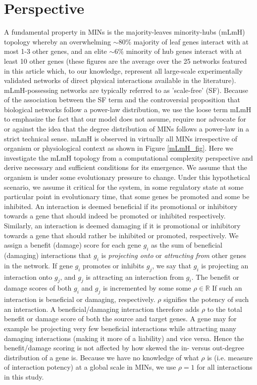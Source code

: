 \section{Perspective}
        A fundamental property in MINs is the majority-leaves minority-hubs  (mLmH) topology whereby an overwhelming ${\sim}$80\% majority of leaf genes interact with at most 1-3 other genes, and an elite ${\sim}$6\% minority of hub genes interact with at least 10 other genes (these figures are the average over the 25 networks featured in this article which, to our knowledge, represent all large-scale experimentally validated networks of direct physical interactions available in the literature). mLmH-possessing networks are typically referred to as 'scale-free' (SF). Because of the association between the SF term and the controversial proposition \cite{arita_metabolic_2004, tanaka_protein_2005, fox_keller_revisiting_2005, khanin_how_2006} that biological networks follow a power-law distribution, we use the loose term mLmH to emphasize the fact that our model does not assume, require nor advocate for or against the idea that the degree distribution of MINs follows a power-law in a strict technical sense.
        mLmH is observed in virtually all MINs irrespective of organism or physiological context as shown in Figure \ref{mLmH_fig}. Here we investigate the mLmH topology from a computational complexity perspective and derive necessary and sufficient conditions for its emergence. We assume that the organism is under some evolutionary pressure to change. Under this hypothetical scenario, we assume it critical for the system, in some regulatory state at some particular point in evolutionary time,  that some genes be promoted and some be inhibited. An interaction is deemed beneficial if its promotional or inhibitory towards a gene that should indeed be promoted or inhibited respectively. Similarly, an interaction is deemed  damaging if it is promotional or inhibitory towards a gene that should rather be inhibited or promoted, respectively. We assign a benefit (damage) score for each gene $g_i$ as the sum of beneficial (damaging) interactions that $g_i$ is \textit{projecting onto} or \textit{attracting  from} other genes in the network. If gene $g_i$ promotes or inhibits $g_j$, we say that $g_i$ is projecting an interaction onto $g_j$, and $g_j$ is attracting an interaction from $g_i$. The benefit or damage scores of both $g_i$ and $g_j$ is incremented by some some $\rho\in\mathbb{R}$ If such an interaction is beneficial or damaging, respectively. $\rho$ signifies the potency of such an interaction. A beneficial/damaging interaction therefore adds $\rho$ to the total benefit or damage score of both the source and target genes. A gene may for example be projecting very few beneficial interactions while attracting many damaging interactions (making it more of a liability) and vice versa. Hence the benefit/damage scoring is not affected by how skewed the in- versus out-degree distribution of a gene is. Because we have no knowledge of what $\rho$ is (i.e. measure of interaction potency) at a global scale in MINs, we use $\rho=1$ for all interactions in this study.

